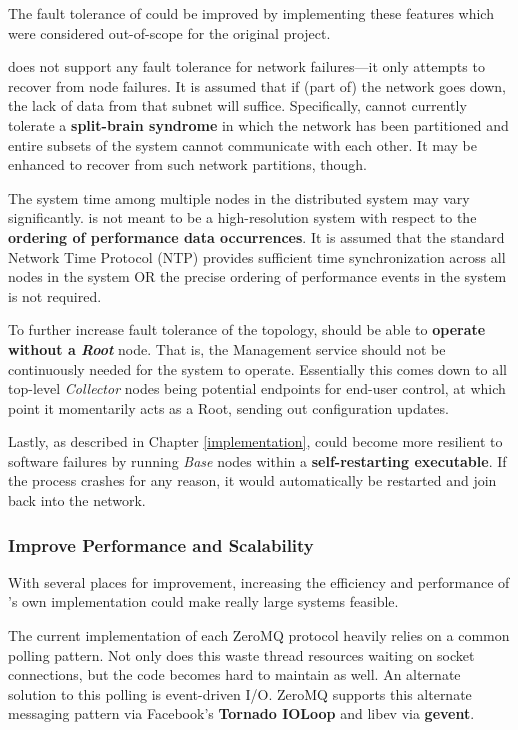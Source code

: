 The fault tolerance of \dcamp could be improved by implementing these features which were considered out-of-scope for
the original project.

\dcamp does not support any fault tolerance for network failures---it only attempts to recover from node failures. It is
assumed that if (part of) the network goes down, the lack of data from that subnet will suffice. Specifically, \dcamp
cannot currently tolerate a \textbf{split-brain syndrome} in which the network has been partitioned and entire subsets
of the system cannot communicate with each other. It may be enhanced to recover from such network partitions, though.

The system time among multiple nodes in the distributed system may vary significantly. \dcamp is not meant to be a
high-resolution system with respect to the \textbf{ordering of performance data occurrences}. It is assumed that the
standard Network Time Protocol (NTP) provides sufficient time synchronization across all nodes in the system OR the
precise ordering of performance events in the system is not required.

To further increase fault tolerance of the topology, \dcamp should be able to \textbf{operate without a \textit{Root}}
node. That is, the Management service should not be continuously needed for the system to operate. Essentially this
comes down to all top-level \textit{Collector} nodes being potential endpoints for end-user control, at which point it
momentarily acts as a Root, sending out configuration updates.

Lastly, as described in Chapter \ref{implementation}, \dcamp could become more resilient to software failures by running
\textit{Base} nodes within a \textbf{self-restarting executable}. If the process crashes for any reason, it would
automatically be restarted and join back into the network.

\subsubsection{Improve Performance and Scalability}

With several places for improvement, increasing the efficiency and performance of \dcampns's own implementation could
make really large systems feasible.

The current implementation of each ZeroMQ protocol heavily relies on a common polling pattern. Not only does this waste
thread resources waiting on socket connections, but the code becomes hard to maintain as well. An alternate solution to
this polling is event-driven I/O. ZeroMQ supports this alternate messaging pattern via Facebook's \textbf{Tornado
IOLoop}\cite{tornado}\cite{ioloop} and libev via \textbf{gevent}\cite{gevent}\cite{libev}.

